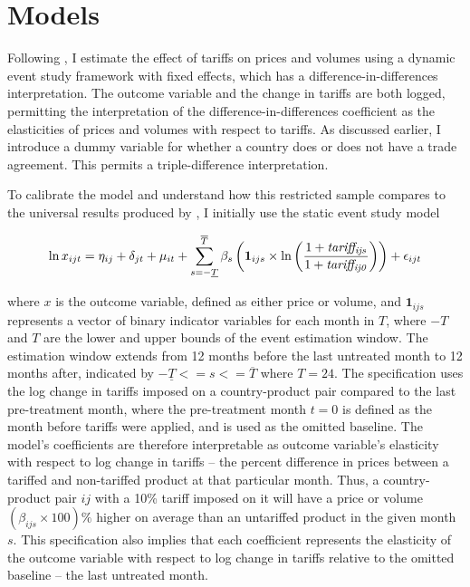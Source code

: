 \section{Models}\label{sec:models}

Following \textcite{amiti_whos_2020}, I estimate the effect of tariffs on prices and volumes using a dynamic event study framework with fixed effects, which has a difference-in-differences interpretation. The outcome variable and the change in tariffs are both logged, permitting the interpretation of the difference-in-differences coefficient as the elasticities of prices and volumes with respect to tariffs. As discussed earlier, I introduce a dummy variable for whether a country does or does not have a trade agreement. This permits a triple-difference interpretation. 

To calibrate the model and understand how this restricted sample compares to the universal results produced by \textcite{amiti_whos_2020}, I initially use the static event study model

    \begin{equation}
        \ln x_{ijt} = \eta_{ij} + \delta_{jt} + \mu_{it} + \sum_{s = -\underline{T}}^{\overline{T}} \beta_s \left( \mathbf{1}_{ijs} \times \ln \left( \frac{1 + \mathit{tariff_{ijs}}}{1 + \mathit{tariff_{ij0}}} \right) \right) \notag + \epsilon_{ijt}
        \label{eq:calibration}
    \end{equation}

where $x$ is the outcome variable, defined as either price or volume, and $\mathbf{1}_{ijs}$ represents a vector of binary indicator variables for each month in $T$, where $-T$ and $T$ are the lower and upper bounds of the event estimation window. The estimation window extends from 12 months before the last untreated month to 12 months after, indicated by $-\underline{T} <= s <= {\overline{T}}$ where $T=24$. The specification uses the log change in tariffs imposed on a country-product pair compared to the last pre-treatment month, where the pre-treatment month $t=0$ is defined as the month before tariffs were applied, and is used as the omitted baseline. The model's coefficients are therefore interpretable as outcome variable's elasticity with respect to log change in tariffs -- the percent difference in prices between a tariffed and non-tariffed product at that particular month. Thus, a country-product pair $ij$ with a 10\% tariff imposed on it will have a price or volume $(\beta_{ijs} \times 100)\%$ higher on average than an untariffed product in the given month $s$. This specification also implies that each coefficient represents the elasticity of the outcome variable with respect to log change in tariffs relative to the omitted baseline -- the last untreated month. 

